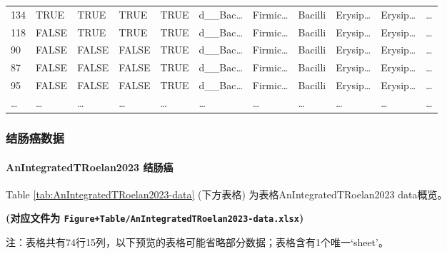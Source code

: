 \documentclass[
]{article}
\begin{document}
\begin{longtable}[]{@{}lllllllllll@{}}
134 & TRUE & TRUE & TRUE & TRUE & d\_\_Bac\ldots{} & Firmic\ldots{} & Bacilli & Erysip\ldots{} & Erysip\ldots{} & \ldots{}\tabularnewline
118 & FALSE & TRUE & TRUE & TRUE & d\_\_Bac\ldots{} & Firmic\ldots{} & Bacilli & Erysip\ldots{} & Erysip\ldots{} & \ldots{}\tabularnewline
90 & FALSE & FALSE & FALSE & TRUE & d\_\_Bac\ldots{} & Firmic\ldots{} & Bacilli & Erysip\ldots{} & Erysip\ldots{} & \ldots{}\tabularnewline
87 & FALSE & FALSE & FALSE & TRUE & d\_\_Bac\ldots{} & Firmic\ldots{} & Bacilli & Erysip\ldots{} & Erysip\ldots{} & \ldots{}\tabularnewline
95 & FALSE & FALSE & FALSE & TRUE & d\_\_Bac\ldots{} & Firmic\ldots{} & Bacilli & Erysip\ldots{} & Erysip\ldots{} & \ldots{}\tabularnewline
\ldots{} & \ldots{} & \ldots{} & \ldots{} & \ldots{} & \ldots{} & \ldots{} & \ldots{} & \ldots{} & \ldots{} & \ldots{}\tabularnewline
\bottomrule
\end{longtable}

\hypertarget{ux7ed3ux80a0ux764cux6570ux636e}{%
\subsubsection{结肠癌数据}\label{ux7ed3ux80a0ux764cux6570ux636e}}

\hypertarget{anintegratedtroelan2023-ux7ed3ux80a0ux764c}{%
\paragraph{AnIntegratedTRoelan2023 结肠癌}\label{anintegratedtroelan2023-ux7ed3ux80a0ux764c}}

Table \ref{tab:AnIntegratedTRoelan2023-data} (下方表格) 为表格AnIntegratedTRoelan2023 data概览。

\textbf{(对应文件为 \texttt{Figure+Table/AnIntegratedTRoelan2023-data.xlsx})}

\begin{center}\begin{tcolorbox}[colback=gray!10, colframe=gray!50, width=0.9\linewidth, arc=1mm, boxrule=0.5pt]注：表格共有74行15列，以下预览的表格可能省略部分数据；表格含有1个唯一`sheet'。
\end{tcolorbox}
\end{center}
\end{document}
